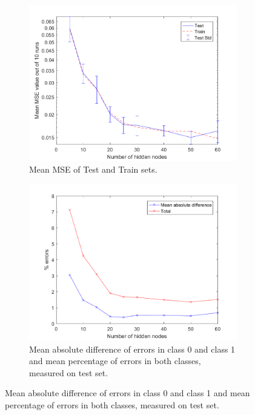 \documentclass[a4paper, 11pt]{article}
\begin{document}
\begin{figure}[h!]
    \centering
    \begin{subfigure}[t]{0.32\textwidth}
        \includegraphics[width=\textwidth]{../figures/perf/mseplot_m(5-60)_e(10-10).png}
        \caption{Mean MSE of Test and Train sets.}
        \label{fig:mse}
    \end{subfigure}
    \hfill %
    \begin{subfigure}[t]{0.32\textwidth}
        \includegraphics[width=\textwidth]{../figures/perf/errorplot_m(5-60)_e(10-10).png}
        \caption{Mean absolute difference of errors in class 0 and class 1 and mean percentage of errors in both classes, measured on test set.}

\end{subfigure}
\end{figure}
\end{document}
